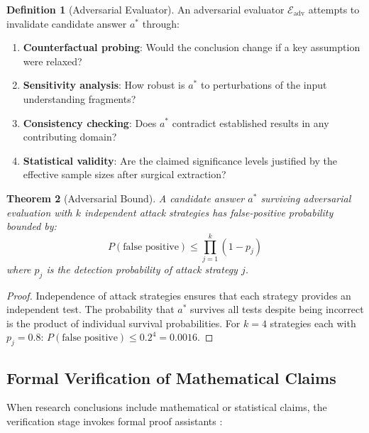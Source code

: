 \documentclass[10pt,twocolumn]{article}
\newtheorem{theorem}{Theorem}[section]
\theoremstyle{definition}
\newtheorem{definition}[theorem]{Definition}
\theoremstyle{remark}
\begin{document}
\begin{definition}[Adversarial Evaluator]
An adversarial evaluator $\mathcal{E}_{\text{adv}}$ attempts to invalidate candidate answer $a^*$ through:
\begin{enumerate}[nosep]
\item \textbf{Counterfactual probing}: Would the conclusion change if a key assumption were relaxed?
\item \textbf{Sensitivity analysis}: How robust is $a^*$ to perturbations of the input understanding fragments?
\item \textbf{Consistency checking}: Does $a^*$ contradict established results in any contributing domain?
\item \textbf{Statistical validity}: Are the claimed significance levels justified by the effective sample sizes after surgical extraction?
\end{enumerate}
\end{definition}

\begin{theorem}[Adversarial Bound]
\label{thm:adversarial}
A candidate answer $a^*$ surviving adversarial evaluation with $k$ independent attack strategies has false-positive probability bounded by:
\begin{equation}
P(\text{false positive}) \leq \prod_{j=1}^{k} (1 - p_j)
\end{equation}
where $p_j$ is the detection probability of attack strategy $j$.
\end{theorem}

\begin{proof}
Independence of attack strategies ensures that each strategy provides an independent test. The probability that $a^*$ survives all tests despite being incorrect is the product of individual survival probabilities. For $k = 4$ strategies each with $p_j = 0.8$: $P(\text{false positive}) \leq 0.2^4 = 0.0016$.
\end{proof}

\subsection{Formal Verification of Mathematical Claims}

When research conclusions include mathematical or statistical claims, the verification stage invokes formal proof assistants \cite{demoura2021,bertot2010}:
\end{document}
